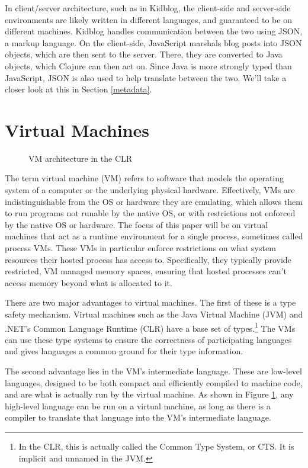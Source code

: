 \documentclass{sig-alternate}
\begin{document}
In client/server architecture, such as in Kidblog, the client-side and server-side environments are likely written in different languages, and guaranteed to be on different machines. Kidblog handles communication between the two using JSON, a markup language. On the client-side, JavaScript marshals blog posts into JSON objects, which are then sent to the server. There, they are converted to Java objects, which Clojure can then act on. Since Java is more strongly typed than JavaScript, JSON is also used to help translate between the two. We'll take a closer look at this in Section \ref{metadata}.



\section{Virtual Machines}\label{VM}
\begin{figure}
\caption{VM architecture in the CLR~\cite{wiki:CLR}}
\label{VMmodel}
\end{figure}

The term virtual machine (VM) refers to software that models the operating system of a computer or the underlying physical hardware. Effectively, VMs are indistinguishable from the OS or hardware they are emulating, which allows them to run programs not runable by the native OS, or with restrictions not enforced by the native OS or hardware.
The focus of this paper will be on virtual machines that act as a runtime environment for a single process, sometimes called process VMs. These VMs in particular enforce restrictions on what system resources their hosted process has access to. Specifically, they typically provide restricted, VM managed memory spaces, ensuring that hosted processes can't access memory beyond what is allocated to it.~\cite{wiki:VM}

There are two major advantages to virtual machines. The first of these is a type safety mechanism. Virtual machines such as the Java Virtual Machine (JVM) and .NET's Common Language Runtime (CLR) have a base set of types.\footnote{In the CLR, this is actually called the Common Type System, or CTS. It is implicit and unnamed in the JVM.} The VMs can use these type systems to ensure the correctness of participating languages and gives languages a common ground for their type information.

The second advantage lies in the VM's intermediate language. These are low-level languages, designed to be both compact and efficiently compiled to machine code, and are what is actually run by the virtual machine. As shown in Figure \ref{VMmodel}, any high-level language can be run on a virtual machine, as long as there is a compiler to translate that language into the VM's intermediate language.
\end{document}
